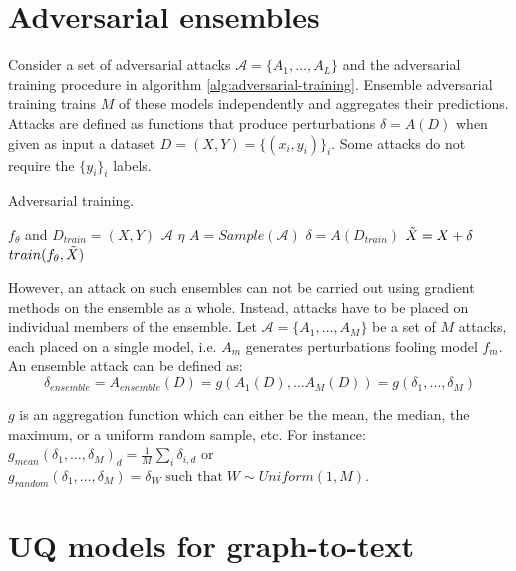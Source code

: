 \section{Adversarial ensembles} \label{section:design:adversarial}
Consider a set of adversarial attacks $\mathcal{A} = \{A_1, \ldots, A_L\}$ and the adversarial training procedure in algorithm \ref{alg:adversarial-training}. Ensemble adversarial training trains $M$ of these models independently and aggregates their predictions. Attacks are defined as functions that produce perturbations $\delta = A(D)$ when given as input a dataset $D = (X,Y) = \{(x_i, y_i)\}_i$. Some attacks do not require the $\{y_i\}_i$ labels.

\begin{algorithm}
\caption{Adversarial training.}\label{alg:adversarial-training}
\begin{algorithmic}

\Require $f_{\theta}$ and $D_{train} = (X,Y)$ 
\Require $\mathcal{A}$ 
\Require $\eta$ 
    \State $A = Sample(\mathcal{A})$
    \State $\delta = A(D_{train})$
    \State $\Tilde{X} = X + \delta$  
    \State $train(f_{\theta}, \Tilde{X})$ 
\EndFor
\end{algorithmic}
\end{algorithm}

However, an attack on such ensembles can not be carried out using gradient methods on the ensemble as a whole. Instead, attacks have to be placed on individual members of the ensemble. Let $\mathcal{A} = \{A_1, \ldots, A_M\}$ be a set of $M$ attacks, each placed on a single model, i.e. $A_m$ generates perturbations fooling model $f_m$. An ensemble attack can be defined as:
$$
\delta_{ensemble} = A_{ensemble}(D) = g(A_1(D), \ldots A_M(D)) = g(\delta_1, \ldots, \delta_M)
$$

$g$ is an aggregation function which can either be the mean, the median, the maximum, or a uniform random sample, etc. For instance:
$
g_{mean}(\delta_1, \ldots, \delta_M)_d = \frac{1}{M} \sum_i \delta_{i,d}
$
or
$
g_{random}(\delta_1, \ldots, \delta_M) = \delta_{W}\; \text{such that} \;  W \sim Uniform(1,M)
$.


\section{UQ models for graph-to-text} \label{design:UQ-models-G2T}

